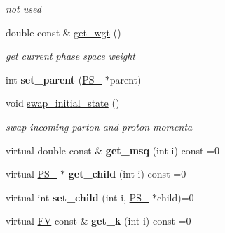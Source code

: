 \begin{DoxyCompactItemize}
\begin{DoxyCompactList}\small\item\em not used \end{DoxyCompactList}\item 
\hypertarget{classPS__2_a049e0480c37ac84a8319f19bcfb335ab}{double const \& \hyperlink{classPS__2_a049e0480c37ac84a8319f19bcfb335ab}{get\-\_\-wgt} ()}\label{classPS__2_a049e0480c37ac84a8319f19bcfb335ab}

\begin{DoxyCompactList}\small\item\em get current phase space weight \end{DoxyCompactList}\item 
\hypertarget{classPS__2_a743942dc8d537cfed9d229aad62aa96a}{int {\bfseries set\-\_\-parent} (\hyperlink{classPS__2}{P\-S\-\_} $\ast$parent)}\label{classPS__2_a743942dc8d537cfed9d229aad62aa96a}

\item 
\hypertarget{classPS__2_afefab6481fa7a0dde6ddc5a1f8d1642f}{void \hyperlink{classPS__2_afefab6481fa7a0dde6ddc5a1f8d1642f}{swap\-\_\-initial\-\_\-state} ()}\label{classPS__2_afefab6481fa7a0dde6ddc5a1f8d1642f}

\begin{DoxyCompactList}\small\item\em swap incoming parton and proton momenta \end{DoxyCompactList}\item 
\hypertarget{classPS__2_a5865322be9736bf043cc8bd1d5127a52}{virtual double const \& {\bfseries get\-\_\-msq} (int i) const =0}\label{classPS__2_a5865322be9736bf043cc8bd1d5127a52}

\item 
\hypertarget{classPS__2_af44e67d84bc53b126d720907adeaffc2}{virtual \hyperlink{classPS__2}{P\-S\-\_} $\ast$ {\bfseries get\-\_\-child} (int i) const =0}\label{classPS__2_af44e67d84bc53b126d720907adeaffc2}

\item 
\hypertarget{classPS__2_a74d62c9ae71d30741838408fabaf4ba3}{virtual int {\bfseries set\-\_\-child} (int i, \hyperlink{classPS__2}{P\-S\-\_} $\ast$child)=0}\label{classPS__2_a74d62c9ae71d30741838408fabaf4ba3}

\item 
\hypertarget{classPS__2_aa23e50a0b5d3ac32fb63afb4f67d3910}{virtual \hyperlink{classFV}{F\-V} const \& {\bfseries get\-\_\-k} (int i) const =0}\label{classPS__2_aa23e50a0b5d3ac32fb63afb4f67d3910}


\end{DoxyCompactItemize}
